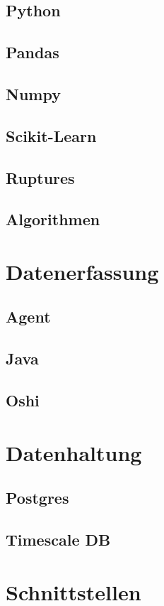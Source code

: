 \documentclass[pdftex,11pt,a4paper]{book}
\begin{document}
\subsection{Python}
\subsection{Pandas}
\subsection{Numpy}
\subsection{Scikit-Learn}
\subsection{Ruptures}
\subsection{Algorithmen}

\section{Datenerfassung}
\subsection{Agent}
\subsection{Java}
\subsection{Oshi}

\section{Datenhaltung}
\subsection{Postgres}
\subsection{Timescale DB}

\section{Schnittstellen}
\end{document}
